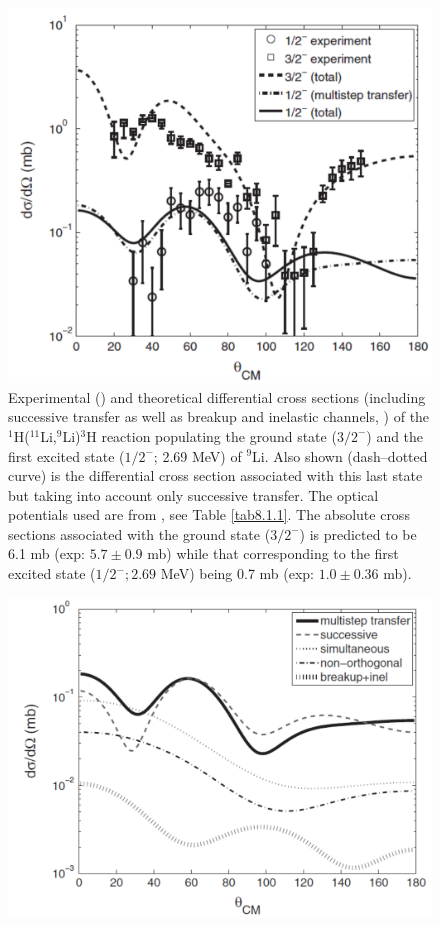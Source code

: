 \begin{subappendices}
    \begin{figure}
    \centerline{\includegraphics*[width=12cm,angle=0]{C8/figsC8/fig8_B_2}}
    	\caption{Experimental (\cite{Tanihata:08}) and theoretical differential cross sections (including successive transfer as well as breakup and inelastic channels, \cite{Potel:10})  of the
    	$^1$H($^{11}$Li,$^9$Li)$^3$H  reaction populating the ground state ($3/2^-$) and the first excited state ($1/2^-$; 2.69 MeV) of $^{9}$Li. Also shown (dash--dotted curve) is the differential cross section associated with this last state but taking into account only successive transfer. The optical potentials used are from \citep{Tanihata:08,An:06}, see Table \ref{tab8.1.1}. The absolute cross sections associated with the ground state ($3/2^-$) is predicted to be 6.1 mb (exp: $5.7\pm 0.9$ mb) while that corresponding to the first excited state ($1/2^-; 2.69$ MeV) being 0.7 mb (exp: $1.0\pm 0.36$ mb). }\label{fig8_B_2}
    \end{figure}
        \begin{figure}
        \centerline{\includegraphics*[width=12cm,angle=0]{C8/figsC8/fig8_B_3}}

\end{figure}
\end{subappendices}
